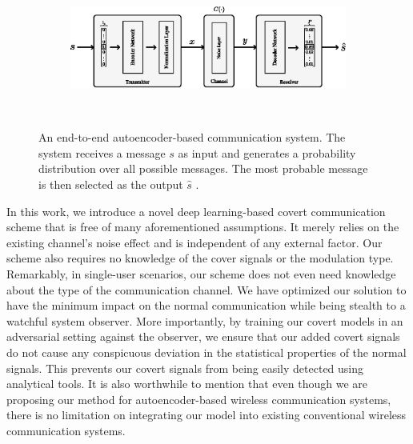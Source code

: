 \begin{figure}[tp!]
	\center
	\begin{subfigure}{0.45\textwidth}
		\includegraphics[width=\linewidth]{figs/original_autoencoder_architecture.eps}
	\end{subfigure}
	\\
	\caption{An end-to-end autoencoder-based communication system. The system receives a message \(s\) as input and generates a probability distribution over all possible messages. The most probable message is then selected as the output \(\hat{s}\) \cite{o2017introduction}.}	
	\label{fig:original_autoencoder_architecture}
\end{figure}

In this work, we introduce a novel deep learning-based covert communication scheme that is free of many aforementioned assumptions. It merely relies on the existing channel's noise effect and is independent of any external factor. Our scheme also requires no knowledge of the cover signals or the modulation type. Remarkably, in single-user scenarios,  our scheme does not even need knowledge about the type of the communication channel. We have optimized our solution to have the minimum impact on the normal communication while being stealth to a watchful system observer. More importantly, by training our covert models in an adversarial setting against the observer, we ensure that our added covert signals do not cause any conspicuous deviation in the statistical properties of the normal signals. This prevents our covert signals from being easily detected using analytical tools. It is also worthwhile to mention that even though we are proposing our method for autoencoder-based wireless communication systems, there is no limitation on integrating our model into existing conventional wireless communication systems.

